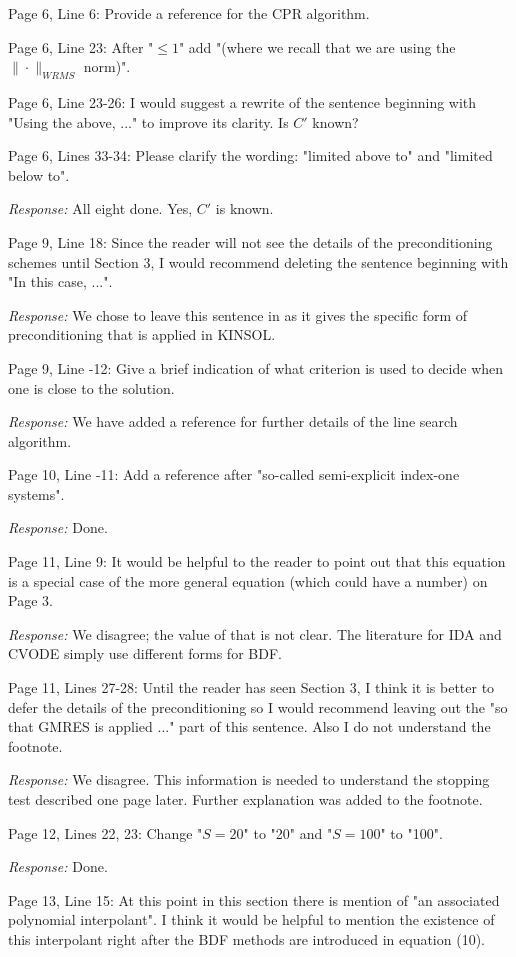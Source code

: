 \documentclass[12pt]{letter}
\begin{document}
Page 6, Line 6: Provide a reference for the CPR algorithm.

Page 6, Line 23: After "$ \leq 1$" add "(where we recall that we are
using the $\|\cdot\|_{WRMS}$ norm)".

Page 6, Line 23-26: I would suggest a rewrite of the sentence beginning
with "Using the above, ..."  to improve its clarity. Is $C'$ known?

Page 6, Lines 33-34: Please clarify the wording: "limited above to" and
"limited below to".

{\em Response:} All eight done. Yes, $C'$ is known.

Page 9, Line 18: Since the reader will not see the details of the
preconditioning schemes until Section 3, I would recommend deleting
the sentence beginning with "In this case, ...".

{\em Response: } We chose to leave this sentence in as it gives the
specific form of preconditioning that is applied in KINSOL.

Page 9, Line -12: Give a brief indication of what criterion is used to
decide when one is close to the solution.

{\em Response: } We have added a reference for further details of
the line search algorithm.

Page 10, Line -11: Add a reference after "so-called semi-explicit
index-one systems".

{\em Response:} Done.

Page 11, Line 9: It would be helpful to the reader to point out that
this equation is a special case of the more general equation (which
could have a number) on Page 3.

{\em Response:} We disagree; the value of that is not clear.  The
literature for IDA and CVODE simply use different forms for BDF.

Page 11, Lines 27-28: Until the reader has seen Section 3, I think it
is better to defer the details of the preconditioning so I would
recommend leaving out the "so that GMRES is applied ..."  part of this
sentence. Also I do not understand the footnote.

{\em Response:} We disagree.  This information is needed to
understand the stopping test described one page later. Further
explanation was added to the footnote.

Page 12, Lines 22, 23: Change "$S = 20$" to "20" and "$S = 100$" to "100".

{\em Response:} Done.

Page 13, Line 15: At this point in this section there is mention of "an
associated polynomial interpolant".  I think it would be helpful to
mention the existence of this interpolant right after the BDF methods
are introduced in equation (10).
\end{document}
